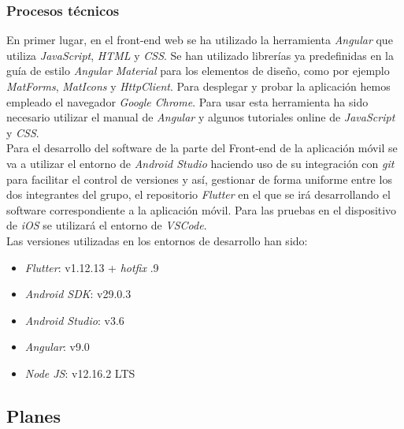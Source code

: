 \documentclass{article}
\begin{document}
\subsubsection{Procesos técnicos}
En primer lugar, en el front-end web se ha utilizado la herramienta \textit{Angular} que utiliza \textit{JavaScript}, \textit{HTML} y \textit{CSS}. Se han utilizado librerías ya predefinidas en la guía de estilo \textit{Angular Material} para los elementos de diseño, como por ejemplo \textit{MatForms}, \textit{MatIcons} y \textit{HttpClient}. Para desplegar y probar la aplicación hemos empleado el navegador \textit{Google Chrome}.
Para usar esta herramienta ha sido necesario utilizar el manual de \textit{Angular} y algunos tutoriales online de \textit{JavaScript} y \textit{CSS}.\\
\newpage
Para el desarrollo del software de la parte del Front-end de la aplicación móvil se va a utilizar el entorno de \textit{Android Studio} haciendo uso de su integración con \textit{git} para facilitar el control de versiones y así, gestionar de forma uniforme entre los dos integrantes del grupo, el repositorio \textit{Flutter} en el que se irá desarrollando el software correspondiente a la aplicación móvil. Para las pruebas en el dispositivo de \textit{iOS} se utilizará el entorno de \textit{VSCode}.\\
\hfill \break
Las versiones utilizadas en los entornos de desarrollo han sido:
		\begin{itemize}
			\item \textit{Flutter}: v1.12.13 + \textit{hotfix} .9
			\item \textit{Android SDK}: v29.0.3
			\item \textit{Android Studio}: v3.6
			\item \textit{Angular}: v9.0
			\item \textit{Node JS}: v12.16.2 LTS
		\end{itemize}
\newpage
\subsection{Planes}
\end{document}
